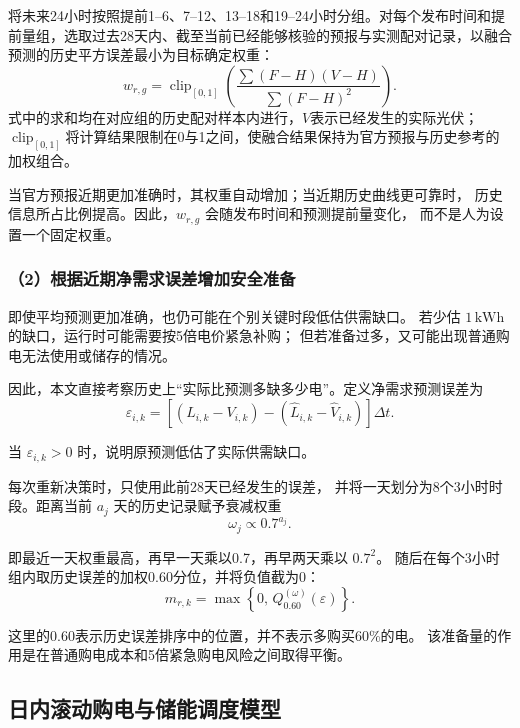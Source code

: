 将未来24小时按照提前1--6、7--12、13--18和19--24小时分组。对每个发布时间和提前量组，选取过去28天内、截至当前已经能够核验的预报与实测配对记录，以融合预测的历史平方误差最小为目标确定权重：
\begin{equation}
w_{r,g}
=
\operatorname{clip}_{[0,1]}
\left(
\frac{
\sum (F-H)(V-H)
}{
\sum (F-H)^2
}
\right).
\end{equation}
式中的求和均在对应组的历史配对样本内进行，$V$表示已经发生的实际光伏；$\operatorname{clip}_{[0,1]}$将计算结果限制在0与1之间，使融合结果保持为官方预报与历史参考的加权组合。

当官方预报近期更加准确时，其权重自动增加；当近期历史曲线更可靠时，
历史信息所占比例提高。因此，$w_{r,g}$ 会随发布时间和预测提前量变化，
而不是人为设置一个固定权重。


\subsubsection*{（2）根据近期净需求误差增加安全准备}

即使平均预测更加准确，也仍可能在个别关键时段低估供需缺口。
若少估 $1\,\mathrm{kWh}$ 的缺口，运行时可能需要按5倍电价紧急补购；
但若准备过多，又可能出现普通购电无法使用或储存的情况。

因此，本文直接考察历史上“实际比预测多缺多少电”。定义净需求预测误差为
\begin{equation}
\varepsilon_{i,k}
=
\left[
(L_{i,k}-V_{i,k})
-
(\widehat{L}_{i,k}-\widehat{V}_{i,k})
\right]\Delta t.
\end{equation}

当 $\varepsilon_{i,k}>0$ 时，说明原预测低估了实际供需缺口。

每次重新决策时，只使用此前28天已经发生的误差，
并将一天划分为8个3小时时段。距离当前 $a_j$ 天的历史记录赋予衰减权重
\begin{equation}
\omega_j
\propto
0.7^{a_j}.
\end{equation}

即最近一天权重最高，再早一天乘以0.7，再早两天乘以 $0.7^2$。
随后在每个3小时组内取历史误差的加权0.60分位，并将负值截为0：
\begin{equation}
m_{r,k}
=
\max
\left\{
0,\,
Q_{0.60}^{(\omega)}(\varepsilon)
\right\}.
\end{equation}

这里的0.60表示历史误差排序中的位置，并不表示多购买60\%的电。
该准备量的作用是在普通购电成本和5倍紧急购电风险之间取得平衡。


\subsection{日内滚动购电与储能调度模型}

